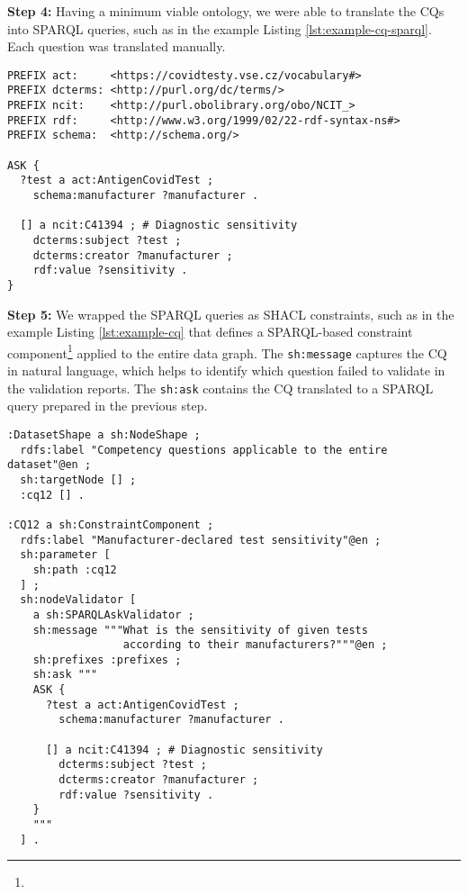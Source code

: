 \documentclass[
]{ceurart}
\begin{document}
\textbf{Step 4:} Having a minimum viable ontology, we were able to translate the CQs into SPARQL queries, such as in the example Listing \ref{lst:example-cq-sparql}. Each question was translated manually.

\begin{lstlisting}[caption=Example competency question in SPARQL, label={lst:example-cq-sparql}]
PREFIX act:     <https://covidtesty.vse.cz/vocabulary#>
PREFIX dcterms: <http://purl.org/dc/terms/>
PREFIX ncit:    <http://purl.obolibrary.org/obo/NCIT_>
PREFIX rdf:     <http://www.w3.org/1999/02/22-rdf-syntax-ns#>
PREFIX schema:  <http://schema.org/>

ASK {
  ?test a act:AntigenCovidTest ;
    schema:manufacturer ?manufacturer .

  [] a ncit:C41394 ; # Diagnostic sensitivity
    dcterms:subject ?test ;
    dcterms:creator ?manufacturer ;
    rdf:value ?sensitivity .
}
\end{lstlisting}

\textbf{Step 5:} We wrapped the SPARQL queries as SHACL constraints, such as in the example Listing \ref{lst:example-cq} that defines a SPARQL-based constraint component\footnote{\urlshaclconstraintcomponent} applied to the entire data graph. The \texttt{sh:message} captures the CQ in natural language, which helps to identify which question failed to validate in the validation reports. The \texttt{sh:ask} contains the CQ translated to a SPARQL query prepared in the previous step.

\begin{lstlisting}[language=turtle, caption=Example competency question in SHACL,label={lst:example-cq}]
:DatasetShape a sh:NodeShape ;
  rdfs:label "Competency questions applicable to the entire dataset"@en ;
  sh:targetNode [] ;
  :cq12 [] .

:CQ12 a sh:ConstraintComponent ;
  rdfs:label "Manufacturer-declared test sensitivity"@en ;
  sh:parameter [
    sh:path :cq12
  ] ;
  sh:nodeValidator [
    a sh:SPARQLAskValidator ;
    sh:message """What is the sensitivity of given tests
                  according to their manufacturers?"""@en ;
    sh:prefixes :prefixes ;
    sh:ask """
    ASK {
      ?test a act:AntigenCovidTest ;
        schema:manufacturer ?manufacturer .

      [] a ncit:C41394 ; # Diagnostic sensitivity
        dcterms:subject ?test ;
        dcterms:creator ?manufacturer ;
        rdf:value ?sensitivity .
    }
    """
  ] .
\end{lstlisting}
\end{document}
